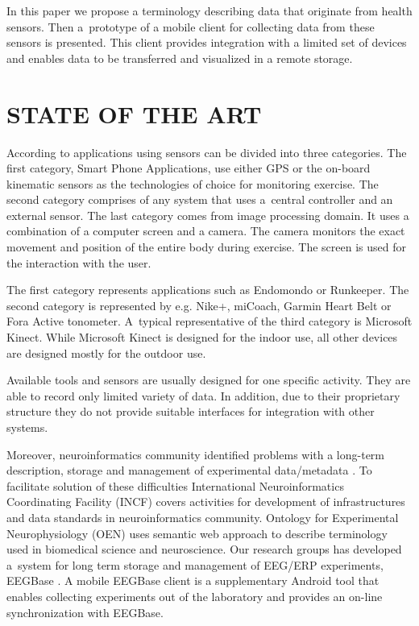 \documentclass[a4paper,twoside]{article}
\begin{document}
In this paper we propose a terminology describing data that originate from health sensors. Then a~prototype of a mobile client for collecting data from these sensors is presented. This client provides integration with a limited set of devices and enables data to be transferred and visualized in a remote storage.

\section{\uppercase{state of the art}}
\label{sec:state-of-the-art}

\noindent
According to \cite{Lowe2012242} applications using sensors can be divided into three categories. The first category, Smart Phone Applications, use either GPS or the
on-board kinematic sensors as the technologies of choice for monitoring exercise. The second category comprises of any system that uses a~central controller
and an external sensor. The last category comes from image processing domain. It uses a combination of a computer screen and a camera. The camera monitors the exact movement and position of the entire body during exercise. The screen is used for the interaction with the user.

The first category represents applications such as Endomondo or Runkeeper. The second category is represented by e.g. Nike+, miCoach, Garmin Heart Belt or Fora Active tonometer. A~typical representative of the third category is Microsoft Kinect. While Microsoft Kinect is designed for the indoor use, all other devices are designed mostly for the outdoor use.

Available tools and sensors are usually designed for one specific activity. They are able to record only limited variety of data. In addition, due to their proprietary structure they do not provide suitable interfaces for integration with other systems.

Moreover, neuroinformatics community identified problems with a long-term description, storage and management of experimental data/metadata \cite{CRCNS}. To facilitate solution of these difficulties International Neuroinformatics Coordinating Facility (INCF) \cite{INCF} covers activities for development of infrastructures and data standards in neuroinformatics community. Ontology for Experimental Neurophysiology (OEN) \cite{10.3389/conf.fninf.2014.18.00044} uses semantic web approach to describe terminology used in biomedical science and neuroscience.  Our research groups has developed a~system for long term storage and management of EEG/ERP experiments, EEGBase \cite{ISI:000306821100004}. A mobile EEGBase client \cite{10.3389/conf.fninf.2013.09.00046} is a supplementary Android tool that enables collecting experiments out of the laboratory and provides an on-line synchronization with EEGBase.
\end{document}
